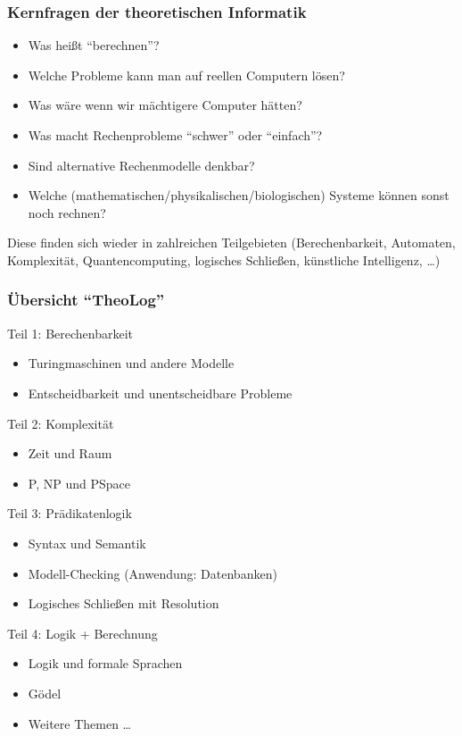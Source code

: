 \documentclass[onlymath]{beamer}
\begin{document}
\begin{frame}\frametitle{Kernfragen der theoretischen Informatik}

\begin{itemize}
\item Was heißt "`berechnen"'?
\item Welche Probleme kann man auf reellen Computern lösen?
\item Was wäre wenn wir mächtigere Computer hätten?
\item Was macht Rechenprobleme "`schwer"' oder "`einfach"'?
\item Sind alternative Rechenmodelle denkbar?
\item Welche (mathematischen/physikalischen/biologischen) Systeme können sonst noch rechnen?
\end{itemize}

Diese finden sich wieder in zahlreichen Teilgebieten (Berechenbarkeit, Automaten, Komplexität, Quantencomputing, logisches Schließen, künstliche Intelligenz, \ldots)

\end{frame}

\begin{frame}\frametitle{Übersicht "`TheoLog"'}

\alert{Teil 1: Berechenbarkeit}
\begin{itemize}
\item Turingmaschinen und andere Modelle
\item Entscheidbarkeit und unentscheidbare Probleme
\end{itemize}

\alert{Teil 2: Komplexität}
\begin{itemize}
\item Zeit und Raum
\item P, NP und PSpace
\end{itemize}

\alert{Teil 3: Prädikatenlogik}
\begin{itemize}
\item Syntax und Semantik
\item Modell-Checking (Anwendung: Datenbanken)
\item Logisches Schließen mit Resolution
\end{itemize}

\alert{Teil 4: Logik + Berechnung}
\begin{itemize}
\item Logik und formale Sprachen
\item Gödel
\item Weitere Themen \ldots
\end{itemize}

\end{frame}
\end{document}
